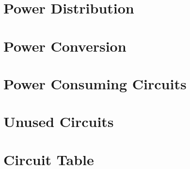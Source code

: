 \section{Power Distribution}

\section{Power Conversion}

\section{Power Consuming Circuits}

\section{Unused Circuits}

\section{Circuit Table}

